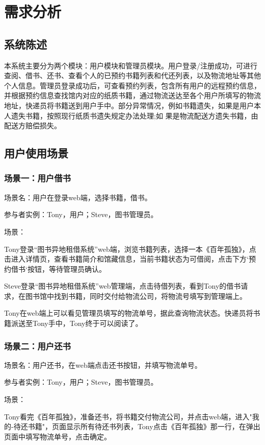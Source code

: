 
\chapter{需求分析}%
\section{系统陈述}
本系统主要分为两个模块：用户模块和管理员模块。用户登录/注册成功，可进行查阅、借书、还书、查看个人的已预约书籍列表和代还列表，以及物流地址等其他个人信息。管理员登录成功后，可查看预约列表，包含所有用户的远程预约信息，并根据预约信息查找馆内对应的纸质书籍，通过物流送达至各个用户所填写的物流地址，快递员将书籍送到用户手中。部分异常情况，例如书籍遗失，如果是用户本人遗失书籍，按照现行纸质书遗失规定办法处理;如
果是物流配送方遗失书籍，由配送方赔偿损失。
\section{用户使用场景}
\subsection{场景一：用户借书}
场景名：用户在登录web端，选择书籍，借书。

参与者实例：Tony，用户；Steve，图书管理员。

场景：

Tony登录“图书异地租借系统”web端，浏览书籍列表，选择一本《百年孤独》，点击进入详情页，查看书籍简介和馆藏信息，当前书籍状态为可借阅，点击下方`预约借书`按钮，等待管理员确认。

Steve登录“图书异地租借系统”web管理端，点击待借列表，看到Tony的借书请求，在图书馆中找到书籍，同时交付给物流公司，将物流号填写到管理端上。

Tony在web端上可以看见管理员填写的物流单号，据此查询物流状态。快递员将书籍派送至Tony手中，Tony终于可以阅读了。
\subsection{场景二：用户还书}
场景名：用户还书，在web端点击还书按钮，并填写物流单号。

参与者实例：Tony，用户；Steve，图书管理员。

场景：

Tony看完《百年孤独》，准备还书，将书籍交付物流公司，并点击web端，进入"我的-待还书籍"，页面显示所有待还书列表，Tony点击《百年孤独》那一行，在弹出页面中填写物流单号，点击确定。

